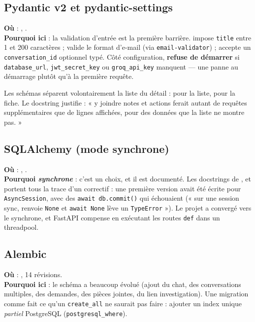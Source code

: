 \subsection{Pydantic v2 et pydantic-settings}
\textbf{Où} : , .\\
\textbf{Pourquoi ici} : la validation d'entrée est la première barrière.
 impose \texttt{title} entre 1 et 200 caractères ;
 valide le format d'e-mail (via \texttt{email-validator}) ;
 accepte un \texttt{conversation\_id} optionnel typé.
Côté configuration,  \textbf{refuse de démarrer} si
\texttt{database\_url}, \texttt{jwt\_secret\_key} ou \texttt{groq\_api\_key}
manquent --- une panne au démarrage plutôt qu'à la première requête.

\begin{infobox}
Les schémas séparent volontairement la liste du détail : 
pour la liste,  pour la fiche. Le docstring justifie :
« y joindre notes et actions ferait autant de requêtes supplémentaires que de
lignes affichées, pour des données que la liste ne montre pas. »
\end{infobox}

\subsection{SQLAlchemy (mode synchrone)}
\textbf{Où} : , .\\
\textbf{Pourquoi \emph{synchrone}} : c'est un choix, et il est documenté. Les
docstrings de ,  et
 portent tous la trace d'un correctif : une première version
avait été écrite pour \texttt{AsyncSession}, avec des \texttt{await
db.commit()} qui échouaient (« sur une session sync,  renvoie
\texttt{None} et \texttt{await None} lève un \texttt{TypeError} »). Le projet a
convergé vers le synchrone, et FastAPI compense en exécutant les routes
\texttt{def} dans un threadpool.

\subsection{Alembic}
\textbf{Où} : , 14 révisions.\\
\textbf{Pourquoi ici} : le schéma a beaucoup évolué (ajout du chat, des
conversations multiples, des demandes, des pièces jointes, du lien
investigation). Une migration comme  fait ce qu'un
\texttt{create\_all} ne saurait pas faire : ajouter un index unique
\emph{partiel} PostgreSQL (\texttt{postgresql\_where}).


